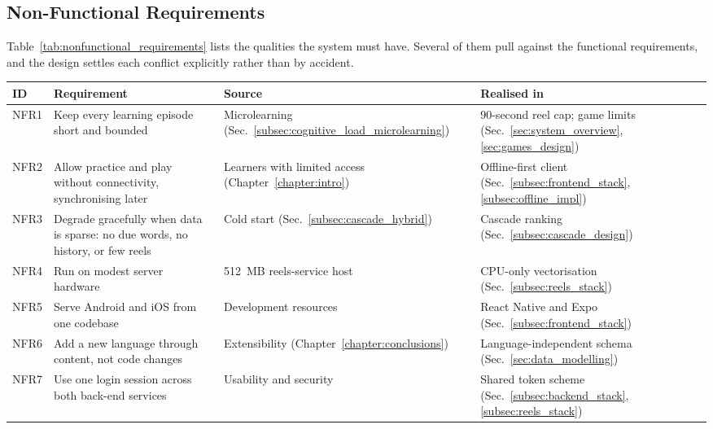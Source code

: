     \subsection{Non-Functional Requirements}
    Table~\ref{tab:nonfunctional_requirements} lists the qualities the system must have. Several of them pull against the functional requirements, and the design settles each conflict explicitly rather than by accident.

    \begin{center}
        \begin{minipage}{\linewidth}%
        \small
        \label{tab:nonfunctional_requirements}
        \begin{tabular}{L{1.1cm}L{5.0cm}L{3.5cm}L{3.5cm}}
            \hline
            \textbf{ID} & \textbf{Requirement} & \textbf{Source} & \textbf{Realised in} \\
            \hline
            NFR1 & Keep every learning episode short and bounded & Microlearning (Sec.~\ref{subsec:cognitive_load_microlearning}) & 90-second reel cap; game limits (Sec.~\ref{sec:system_overview}, \ref{sec:games_design}) \\
            \hline
            NFR2 & Allow practice and play without connectivity, synchronising later & Learners with limited access (Chapter~\ref{chapter:intro}) & Offline-first client (Sec.~\ref{subsec:frontend_stack}, \ref{subsec:offline_impl}) \\
            \hline
            NFR3 & Degrade gracefully when data is sparse: no due words, no history, or few reels & Cold start (Sec.~\ref{subsec:cascade_hybrid}) & Cascade ranking (Sec.~\ref{subsec:cascade_design}) \\
            \hline
            NFR4 & Run on modest server hardware & 512~MB reels-service host & CPU-only vectorisation (Sec.~\ref{subsec:reels_stack}) \\
            \hline
            NFR5 & Serve Android and iOS from one codebase & Development resources & React Native and Expo (Sec.~\ref{subsec:frontend_stack}) \\
            \hline
            NFR6 & Add a new language through content, not code changes & Extensibility (Chapter~\ref{chapter:conclusions}) & Language-independent schema (Sec.~\ref{sec:data_modelling}) \\
            \hline
            NFR7 & Use one login session across both back-end services & Usability and security & Shared token scheme (Sec.~\ref{subsec:backend_stack}, \ref{subsec:reels_stack}) \\
            \hline
        \end{tabular}
        \end{minipage}
    \end{center}

